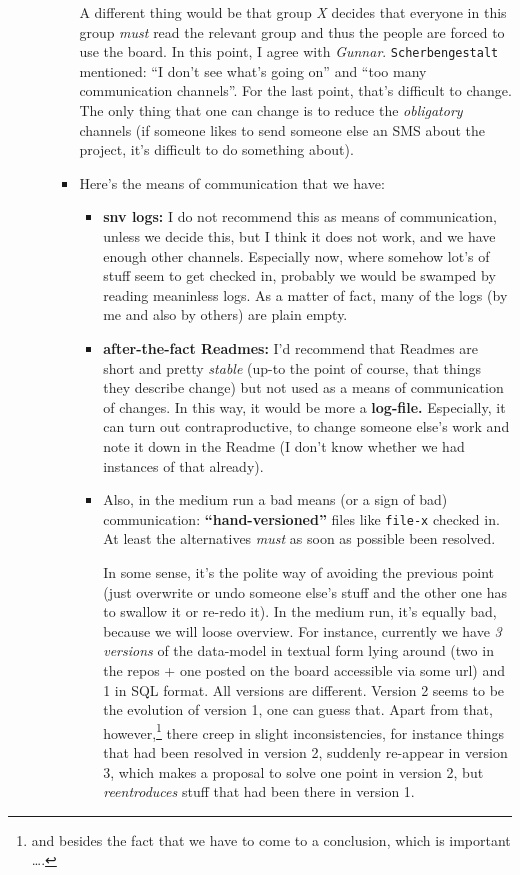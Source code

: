 \documentclass[11pt,handout,nologo]{handout}
\begin{document}
\begin{itemize}
\begin{itemize}
\begin{itemize}
      A different thing would be that group \emph{X} decides that everyone
      in this group \emph{must} read the relevant group and thus the people
      are forced to use the board. In this point, I agree with
      \emph{Gunnar}. \texttt{Scherbengestalt} mentioned: ``I don't see
      what's going on'' and ``too many communication channels''. For the
      last point, that's difficult to change. The only thing that one can
      change is to reduce the \emph{obligatory} channels (if someone likes
      to send someone else an SMS about the project, it's difficult to do
      something about).
    \item Here's the means of communication that we have:
      \begin{itemize}
      \item \textbf{snv logs:} I do not recommend this as means of
        communication, unless we decide this, but I think it does not work,
        and we have enough other channels. Especially now, where somehow
        lot's of stuff seem to get checked in, probably we would be swamped
        by reading meaninless logs. As a matter of fact, many of the logs
        (by me and also by others) are plain empty.
      \item \textbf{after-the-fact Readmes:} I'd recommend that Readmes are
        short and pretty \emph{stable} (up-to the point of course, that
        things they describe change) but not used as a means of
        communication of changes. In this way, it would be more a
        \textbf{log-file.}  Especially, it can turn out contraproductive,
        to change someone else's work and note it down in the Readme (I
        don't know whether we had instances of that already).
      \item Also, in the medium run a bad means (or a sign of bad)
        communication: \textbf{``hand-versioned''} files like
        \texttt{file-x} checked in. At least the alternatives \emph{must}
        as soon as possible been resolved.
        
        In some sense, it's the polite way of avoiding the previous point
        (just overwrite or undo someone else's stuff and the other one has
        to swallow it or re-redo it). In the medium run, it's equally bad,
        because we will loose overview. For instance, currently we have
        \emph{3 versions} of the data-model in textual form lying around
        (two in the repos + one posted on the board accessible via some
        url) and 1 in SQL format. All versions are different. Version 2
        seems to be the evolution of version 1, one can guess that. Apart
        from that, however,\footnote{and besides the fact that we have to
          come to a conclusion, which is important \ldots.} there creep in
        slight inconsistencies, for instance things that had been resolved
        in version 2, suddenly re-appear in version 3, which makes a
        proposal to solve one point in version 2, but \emph{reentroduces}
        stuff that had been there in version 1.
        

\end{itemize}
\end{itemize}
\end{itemize}
\end{itemize}
\end{document}
